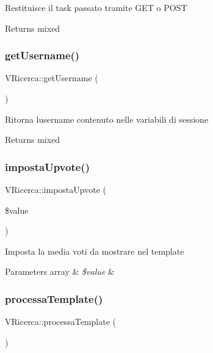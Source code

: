 Restituisce il task passato tramite G\+ET o P\+O\+ST

\begin{DoxyReturn}{Returns}
mixed 
\end{DoxyReturn}
\mbox{\label{class_v_ricerca_a132e577e786b857bb1381258835dd710}} 
\subsubsection{\texorpdfstring{get\+Username()}{getUsername()}}
{\footnotesize\ttfamily V\+Ricerca\+::get\+Username (\begin{DoxyParamCaption}{ }\end{DoxyParamCaption})}

Ritorna l\textquotesingle{}username contenuto nelle variabili di sessione

\begin{DoxyReturn}{Returns}
mixed 
\end{DoxyReturn}
\mbox{\label{class_v_ricerca_a30341bd57866dd8155655fa8b64ed74c}} 
\subsubsection{\texorpdfstring{imposta\+Upvote()}{impostaUpvote()}}
{\footnotesize\ttfamily V\+Ricerca\+::imposta\+Upvote (\begin{DoxyParamCaption}\item[{}]{\$value }\end{DoxyParamCaption})}

Imposta la media voti da mostrare nel template


\begin{DoxyParams}[1]{Parameters}
array & {\em \$value} & \\
\hline
\end{DoxyParams}
\mbox{\label{class_v_ricerca_accab76d9a06a79072c80b4014fd9f66b}} 
\subsubsection{\texorpdfstring{processa\+Template()}{processaTemplate()}}
{\footnotesize\ttfamily V\+Ricerca\+::processa\+Template (\begin{DoxyParamCaption}{ }\end{DoxyParamCaption})}

